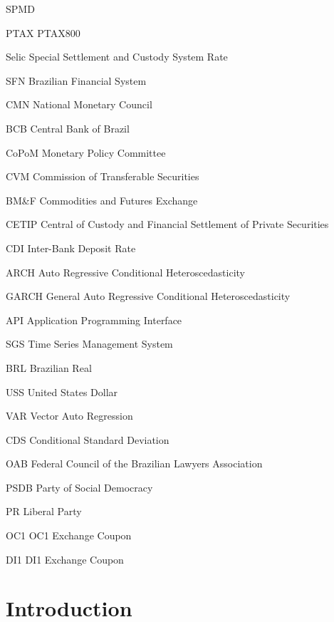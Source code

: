 \documentclass[cic,tc, english]{iiufrgs}
\begin{document}
\begin{listofabbrv}{SPMD}
    \item[PTAX] PTAX800
    \item[Selic] Special Settlement and Custody System Rate
    \item[SFN] Brazilian Financial System
    \item[CMN] National Monetary Council
    \item[BCB] Central Bank of Brazil
    \item[CoPoM] Monetary Policy Committee
    \item[CVM] Commission of Transferable Securities
    \item[BM\&F] Commodities and Futures Exchange
    \item[CETIP] Central of Custody and Financial Settlement of Private Securities
    \item[CDI] Inter-Bank Deposit Rate
    \item[ARCH] Auto Regressive Conditional Heteroscedasticity
    \item[GARCH] General Auto Regressive Conditional Heteroscedasticity
    \item[API] Application Programming Interface
    \item[SGS] Time Series Management System
    \item[BRL] Brazilian Real
    \item[USS] United States Dollar
    \item[VAR] Vector Auto Regression
    \item[CDS] Conditional Standard Deviation
    \item[OAB] Federal Council of the Brazilian Lawyers Association
    \item[PSDB] Party of Social Democracy
    \item[PR] Liberal Party
    \item[OC1] OC1 Exchange Coupon  
    \item[DI1] DI1 Exchange Coupon

\end{listofabbrv}

\tableofcontents


\chapter{Introduction} \label{chapter_introduction}
\end{document}
